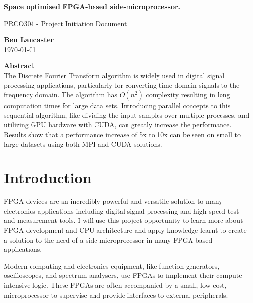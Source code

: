 \documentclass[11pt,a4paper]{article}
\begin{document}
\begin{titlepage}
\begin{center}

\vspace*{3cm}
\Large
\textbf{
Space optimised FPGA-based side-microprocessor.
}

\vspace{0.4cm}
\large
PRCO304 - Project Initiation Document

\vspace{4cm}
\textbf{Ben Lancaster}\\
\today

\vspace{4cm}
\textbf{Abstract}\\
\small
The Discrete Fourier Transform algorithm is widely used in digital signal processing applications, particularly for converting time domain signals to the frequency domain. The algorithm has $O(n^2)$ complexity resulting in long computation times for large data sets. Introducing parallel concepts to this sequential algorithm, like dividing the input samples over multiple processes, and utilizing GPU hardware with CUDA, can greatly increase the performance. Results show that a performance increase of 5x to 10x can be seen on small to large datasets using both MPI and CUDA solutions. 


\end{center}

\end{titlepage}

\renewcommand*\contentsname{Table of Contents}
\tableofcontents
\newpage

\section{Introduction}
FPGA devices are an incredibly powerful and versatile solution to many electronics applications including digital signal processing and high-speed test and measurement tools. I will use this project opportunity to learn more about FPGA development and CPU architecture and apply knowledge learnt to create a solution to the need of a side-microprocessor in many FPGA-based applications.

Modern computing and electronics equipment, like function generators, oscilloscopes, and spectrum analysers, use FPGAs to implement their compute intensive logic. These FPGAs are often accompanied by a small, low-cost, microprocessor to supervise and provide interfaces to external peripherals.
\end{document}
